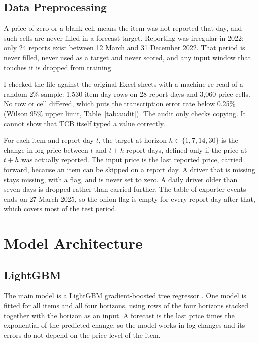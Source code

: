 \subsection{Data Preprocessing}
A price of zero or a blank cell means the item was not reported that day, and such cells are never filled in a forecast target. Reporting was irregular in 2022: only 24 reports exist between 12 March and 31 December 2022. That period is never filled, never used as a target and never scored, and any input window that touches it is dropped from training.

I checked the file against the original Excel sheets with a machine re-read of a random 2\% sample: 1,530 item-day rows on 28 report days and 3,060 price cells. No row or cell differed, which puts the transcription error rate below 0.25\% (Wilson 95\% upper limit, Table~\ref{tab:audit}). The audit only checks copying. It cannot show that TCB itself typed a value correctly.

\begin{table}[H]\centering\small
\caption[Audit of the price file against the TCB sheets]{Audit of the price file against the original TCB sheets.}\label{tab:audit}

\par{}
\end{table}

For each item and report day $t$, the target at horizon $h \in \{1,7,14,30\}$ is the change in log price between $t$ and $t+h$ report days, defined only if the price at $t+h$ was actually reported. The input price is the last reported price, carried forward, because an item can be skipped on a report day. A driver that is missing stays missing, with a flag, and is never set to zero. A daily driver older than seven days is dropped rather than carried further. The table of exporter events ends on 27 March 2025, so the onion flag is empty for every report day after that, which covers most of the test period.

\section{Model Architecture}

\subsection{LightGBM}
The main model is a LightGBM gradient-boosted tree regressor \cite{lightgbm}. One model is fitted for all items and all four horizons, using rows of the four horizons stacked together with the horizon as an input. A forecast is the last price times the exponential of the predicted change, so the model works in log changes and its errors do not depend on the price level of the item.

